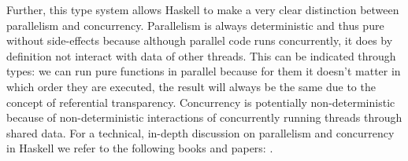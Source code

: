 Further, this type system allows Haskell to make a very clear distinction between parallelism and concurrency. Parallelism is always deterministic and thus pure without side-effects because although parallel code runs concurrently, it does by definition not interact with data of other threads. This can be indicated through types: we can run pure functions in parallel because for them it doesn't matter in which order they are executed, the result will always be the same due to the concept of referential transparency. Concurrency is potentially non-deterministic because of non-deterministic interactions of concurrently running threads through shared data. For a technical, in-depth discussion on parallelism and concurrency in Haskell we refer to the following books and papers: \cite{marlow_parallel_2013,osullivan_real_2008,harris_composable_2005,marlow_runtime_2009}.
